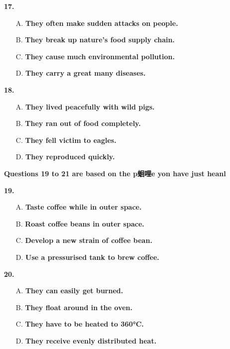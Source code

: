 \documentclass[UTF8,11pt]{ctexart}
\begin{document}
\textbf{17.}


\begin{itemize}[leftmargin=2em,itemsep=.2em,topsep=.4em]\item[A.] \textbf{They often make sudden attacks on people.}
\item[B.] \textbf{They break up nature's food supply chain.}
\item[C.] \textbf{They cause much environmental pollution.}
\item[D.] \textbf{They carry a great many diseases.}
\end{itemize}

\textbf{18.}


\begin{itemize}[leftmargin=2em,itemsep=.2em,topsep=.4em]\item[A.] \textbf{They lived peacefully with wild pigs.}
\item[B.] \textbf{They ran out of food completely.}
\item[C.] \textbf{They fell victim to eagles.}
\item[D.] \textbf{They reproduced quickly.}
\end{itemize}

\textbf{Questions 19 to 21 are based on the p蛔哩e yon have just heanl}


\textbf{19.}


\begin{itemize}[leftmargin=2em,itemsep=.2em,topsep=.4em]\item[A.] \textbf{Taste coffee while in outer space.}
\item[B.] \textbf{Roast coffee beans in outer space.}
\item[C.] \textbf{Develop a new strain of coffee bean.}
\item[D.] \textbf{Use a pressurised tank to brew coffee.}
\end{itemize}

\textbf{20.}


\begin{itemize}[leftmargin=2em,itemsep=.2em,topsep=.4em]\item[A.] \textbf{They can easily get burned.}
\item[B.] \textbf{They float around in the oven.}
\item[C.] \textbf{They have to be heated to 360°C.}
\item[D.] \textbf{They receive evenly distributed heat.}
\end{itemize}
\end{document}
